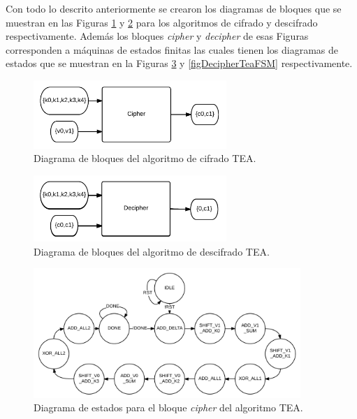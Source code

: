 Con todo lo descrito anteriormente se crearon los diagramas de bloques que se muestran en las Figuras \ref{figCipherBlockDiagramTea} y \ref{figDecipherBlockDiagramTea} para los algoritmos de cifrado y descifrado respectivamente. Además los bloques \textit{cipher} y \textit{decipher} de esas Figuras corresponden a máquinas de estados finitas las cuales tienen los diagramas de estados que se muestran en la Figuras \ref{figCipherTeaFSM} y \ref{figDecipherTeaFSM} respectivamente.

\begin{figure}
	\centering
	\includegraphics[width=0.65\textwidth]{./images/figCipherBlockDiagramTea}
	\caption{Diagrama de bloques del algoritmo de cifrado TEA.}
	\label{figCipherBlockDiagramTea}
\end{figure}

\begin{figure}
	\centering
	\includegraphics[width=0.65\textwidth]{./images/figDecipherBlockDiagramTea}
	\caption{Diagrama de bloques del algoritmo de descifrado TEA.}
	\label{figDecipherBlockDiagramTea}
\end{figure}

\begin{figure}
	\centering
	\includegraphics[width=0.9\textwidth]{./images/figCipherTeaFSM}
	\caption{Diagrama de estados para el bloque \textit{cipher} del algoritmo TEA.}
	\label{figCipherTeaFSM}
\end{figure}

